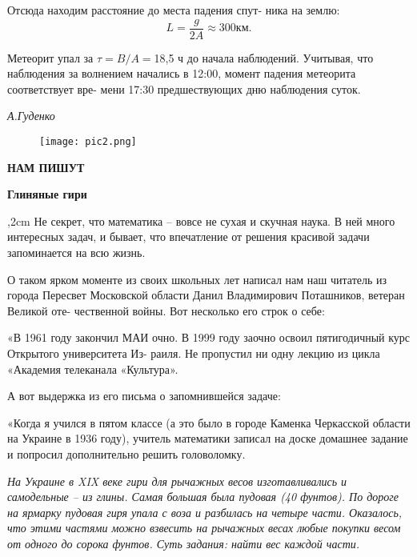 \begin{flushleft}
\begin{multicols}{2}
Отсюда находим расстояние до места падения спут-
ника на землю:
$$L = \frac{g}{2A} \approx 300 \text{км}.$$

Метеорит упал за $\tau = B/A = $18,5 ч до начала наблюдений. 
Учитывая, что наблюдения за волнением начались
в 12:00, момент падения метеорита соответствует вре-
мени 17:30 предшествующих дню наблюдения суток.

{\raggedleft \textit{А.Гуденко}\\}
\end{multicols}

\begin{figure}[h]
\centering
\texttt{[image: pic2.png]}
\end{figure}
\vspace*{-1.4cm}
\begin{center}
\textbf{\large Н\:А\:М\; \;П\:И\:Ш\:У\:Т}
\vspace*{-0.0cm}
\end{center}

\begin{multicols}{2}
\begin{center}
\setmainfont{Arial}
\textbf{\large Глиняные гири}
\vspace*{-0.0cm}
\end{center}
,2cm
Не секрет, что математика – вовсе не сухая и скучная
наука. В ней много интересных задач, и бывает, что
впечатление от решения красивой задачи запоминается на
всю жизнь.

О таком ярком моменте из своих школьных лет написал
нам наш читатель из города Пересвет Московской области
Данил Владимирович Поташников, ветеран Великой оте-
чественной войны. Вот несколько его строк о себе:

«В 1961 году закончил МАИ очно. В 1999 году заочно
освоил пятигодичный курс Открытого университета Из-
раиля. Не пропустил ни одну лекцию из цикла «Академия
телеканала «Культура».

А вот выдержка из его письма о запомнившейся задаче:

«Когда я учился в пятом классе (а это было в городе
Каменка Черкасской области на Украине в 1936 году),
учитель математики записал на доске домашнее задание и
попросил дополнительно решить головоломку.

\textit{На Украине в XIX веке гири для рычажных весов
изготавливались и самодельные – из глины. Самая
большая была пудовая (40 фунтов). По дороге на
ярмарку пудовая гиря упала с воза и разбилась на четыре
части. Оказалось, что этими частями можно взвесить
на рычажных весах любые покупки весом от одного до
сорока фунтов. Суть задания: найти вес каждой части.}


\end{multicols}
\end{flushleft}
